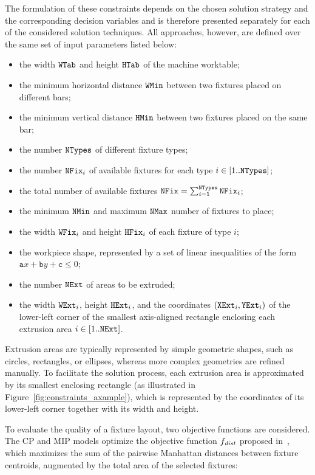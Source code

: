The formulation of these constraints depends on the chosen solution strategy and the corresponding decision variables and is therefore presented separately for each of the considered solution techniques. All approaches, however, are defined over the same set of input parameters listed below:
\begin{itemize}
	\item the width $\mathtt{WTab}$ and height $\mathtt{HTab}$ of the machine worktable;
	\item the minimum horizontal distance $\mathtt{WMin}$ between two fixtures placed on different bars;
	\item the minimum vertical distance $\mathtt{HMin}$ between two fixtures placed on the same bar;
	\item the number $\mathtt{NTypes}$ of different fixture types;
	\item the number $\mathtt{NFix}_i$ of available fixtures for each type $i \in [1..\mathtt{NTypes}]$;
	\item the total number of available fixtures $\mathtt{NFix} = \sum_{i=1}^{\mathtt{NTypes}} \mathtt{NFix}_i$;
	\item the minimum $\mathtt{NMin}$ and maximum $\mathtt{NMax}$ number of fixtures to place;
	\item the width $\mathtt{WFix}_i$ and height $\mathtt{HFix}_i$ of each fixture of type $i$;
	\item the workpiece shape, represented by a set of linear inequalities of the form $\mathtt{a}x + \mathtt{b}y + \mathtt{c} \leq 0$;
	\item the number $\mathtt{NExt}$ of areas to be extruded;
	\item the width $\mathtt{WExt}_i$, height $\mathtt{HExt}_i$, and the coordinates $(\mathtt{XExt}_i,\mathtt{YExt}_i)$ of the lower-left corner of the smallest axis-aligned rectangle enclosing each extrusion area $i \in [1..\mathtt{NExt}]$.
\end{itemize}

Extrusion areas are typically represented by simple geometric shapes, such as circles, rectangles, or ellipses, whereas more complex geometries are refined manually. To facilitate the solution process, each extrusion area is approximated by its smallest enclosing rectangle (as illustrated in Figure~\ref{fig:constraints_axample}), which is represented by the coordinates of its lower-left corner together with its width and height.

To evaluate the quality of a fixture layout, two objective functions are considered. The CP and MIP models optimize the objective function $f_\mathit{dist}$ proposed in~\cite{vitali2026constraint}, which maximizes the sum of the pairwise Manhattan distances between fixture centroids, augmented by the total area of the selected fixtures:

